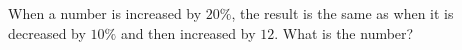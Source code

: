 When a number is increased by $20\%$, the result is the same as when it is decreased by $10\%$ and then increased by $12$. What is the number?
